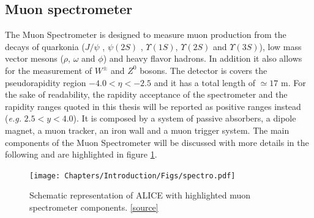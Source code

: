 \subsection{Muon spectrometer}
\label{ALICE_spectrometer}
The Muon Spectrometer is designed to measure muon production from the decays of quarkonia ($J/\psi$ , $\psi(2S)$ , $\Upsilon(1S)$, $\Upsilon(2S)$ and $\Upsilon(3S)$), low mass vector mesons ($\rho$, $\omega$ and $\phi$) and heavy flavor hadrons.
In addition it also allows for the measurement of $W^\pm$ and $Z^0$ bosons. 
The detector is covers the pseudorapidity region $-4.0 < \eta < -2.5$ and it has a total length of $\simeq 17$ m.
For the sake of readability, the rapidity acceptance of the spectrometer and the rapidity ranges quoted in this thesis will be reported as positive ranges instead (\textit{e.g.} $2.5 < y < 4.0$).
It is composed by a system of passive absorbers, a dipole magnet, a muon tracker, an iron wall and a muon trigger system. 
The main components of the Muon Spectrometer will be discussed with more details in the following and are highlighted in figure \ref{fig:spectro}.

\begin{figure}[!h]
\begin{center}
\texttt{[image: Chapters/Introduction/Figs/spectro.pdf]}
\caption{Schematic representation of ALICE with highlighted muon spectrometer components. \href{http://irfu.cea.fr/en/Phocea/Vie_des_labos/Ast/ast_sstechnique.php?id_ast=2245}{[source]}}
\label{fig:spectro}
\end{center}
\end{figure}

